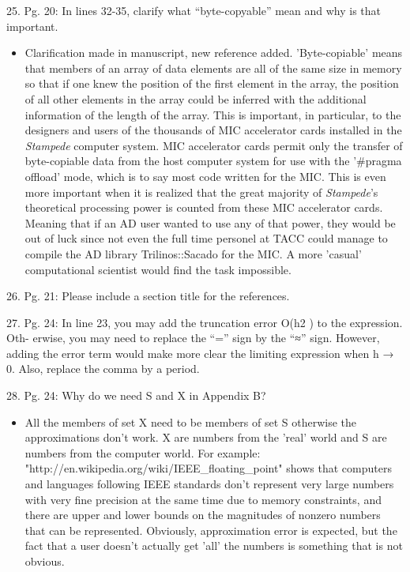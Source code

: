 \documentclass{article}
\begin{document}
\begin{enumerate}
25. Pg. 20: In lines 32-35, clarify what “byte-copyable” mean and why is that important.
{\color{red}  
\begin{itemize}
     \item
     Clarification made in manuscript, new reference added. 'Byte-copiable' means that members of an array of data elements are all of the same size in memory so that if one knew the position of the first element in the array, the position of all other elements in the array could be inferred with the additional information of the length of the array. This is important, in particular, to the designers and users of the thousands of MIC accelerator cards installed in the \emph{Stampede} computer system. MIC accelerator cards permit only the transfer of byte-copiable data from the host computer system for use with the '#pragma offload' mode, which is to say most code written for the MIC. This is even more important when it is realized that the great majority of \emph{Stampede}'s theoretical processing power is counted from these MIC accelerator cards. Meaning that if an AD user wanted to use any of that power, they would be out of luck since not even the full time personel at TACC could manage to compile the AD library Trilinos::Sacado for the MIC. A more 'casual' computational scientist would find the task impossible.
  \end{itemize}}

26. Pg. 21: Please include a section title for the references.

27. Pg. 24: In line 23, you may add the truncation error O(h2 ) to the expression. Oth-
erwise, you may need to replace the “=” sign by the “≈” sign. However, adding
the error term would make more clear the limiting expression when h → 0. Also,
replace the comma by a period.

28. Pg. 24: Why do we need S and X in Appendix B?
{\color{red}  
\begin{itemize}
     \item
     All the members of set X need to be members of set S otherwise the approximations don't work. X are numbers from the 'real' world and S are numbers from the computer world. For example: "http://en.wikipedia.org/wiki/IEEE_floating_point" shows that computers and languages following IEEE standards don't represent very large numbers with very fine precision at the same time due to memory constraints, and there are upper and lower bounds on the magnitudes of nonzero numbers that can be represented. Obviously, approximation error is expected, but the fact that a user doesn't actually get 'all' the numbers is something that is not obvious.
  \end{itemize}}



\end{enumerate}
\end{document}
